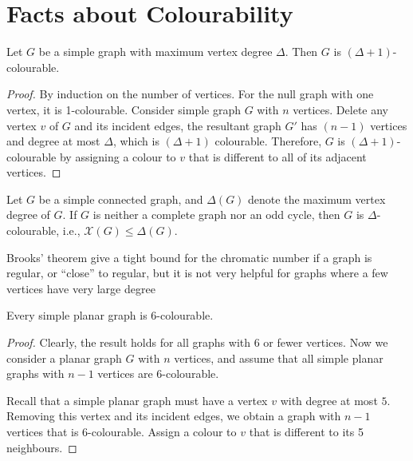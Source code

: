 \section{Facts about Colourability}
\begin{theorem}
Let $G$ be a simple graph with maximum vertex degree $\Delta$. Then $G$ is $(\Delta+1)$-colourable.
\end{theorem}
\begin{proof}
By induction on the number of vertices.
For the null graph with one vertex, it is 1-colourable.
Consider simple graph $G$ with $n$ vertices. Delete any vertex $v$ of $G$ and its incident edges, the resultant graph $G'$ has $(n-1)$ vertices and degree at most $\Delta$, which is $(\Delta+1)$ colourable. Therefore, $G$ is $(\Delta+1)$-colourable by assigning a colour to $v$ that is different to all of its adjacent vertices.
\end{proof}

\begin{theorem}
Let $G$ be a simple connected graph, and $\Delta(G)$ denote the maximum vertex degree of $G$.
If $G$ is neither a complete graph nor an odd cycle, then $G$ is $\Delta$-colourable, i.e., $\mathcal{X}(G)\le\Delta(G)$.
\end{theorem}
\begin{remark}
Brooks’ theorem give a tight bound for the chromatic number if a graph is regular, or “close” to regular, but it is not very helpful for graphs where a few vertices have very large degree
\end{remark}
\begin{theorem}
Every simple planar graph is $6$-colourable.
\end{theorem}
\begin{proof}
Clearly, the result holds for all graphs with 6 or fewer vertices. Now we consider a planar graph $G$ with $n$ vertices, and assume that all simple planar graphs with $n - 1$ vertices are 6-colourable.

Recall that a simple planar graph must have a vertex $v$ with degree at most $5$.
Removing this vertex and its incident edges, we obtain a graph with $n-1$ vertices that is $6$-colourable. Assign a colour to $v$ that is different to its 5 neighbours.
\end{proof}

